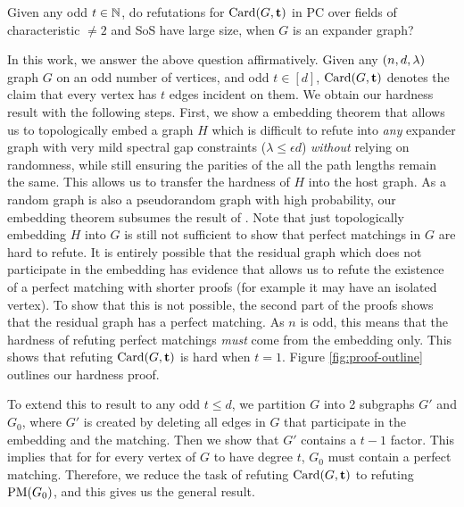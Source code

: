 \documentclass[11pt]{article}
\begin{document}
\begin{problem}
  
Given any odd $t \in \mathbb{N}$, do refutations for $\text{Card}(G, \mathbf{t})$ in
PC over fields of characteristic $\neq 2$ and SoS have large size, when $G$ is an expander graph? 
\end{problem}

In this work, we answer the above question affirmatively.
Given any $(n, d, \lambda)$ graph $G$ on an odd number of vertices, and odd $t\in [d]$, $\text{Card}(G, \mathbf{t})$ denotes the claim that every vertex has $t$ edges incident on them.
We obtain our hardness result with the following steps.
First, we show a embedding theorem that allows us to topologically embed a graph $H$ which is difficult to refute into \emph{any} expander graph with very mild spectral gap constraints ($\lambda \leq \epsilon d$) \emph{without} relying on randomness, while still ensuring the parities of the all the path lengths remain the same.
This allows us to transfer the hardness of $H$ into the host graph.
As a random graph is also a pseudorandom graph with high probability, our embedding theorem subsumes the result of \citet{Austrin_2022}.
Note that just topologically embedding $H$ into $G$ is still not sufficient to show that perfect matchings in $G$ are hard to refute.
It is entirely possible that the residual graph which does not participate in the  embedding has evidence that allows us to refute the existence of a perfect matching with shorter proofs (for example it may have an isolated vertex).
To show that this is not possible, the second part of the proofs shows  that the residual graph has a perfect matching.
As $n$ is odd, this means that the hardness of refuting perfect matchings \emph{must} come from the embedding only.
This shows that refuting $\text{Card}(G, \mathbf{t})$ is hard when $t=1$.
Figure \ref{fig:proof-outline} outlines our hardness proof.  \par
To extend this to result to any odd $t \leq d$, we partition $G$ into 2 subgraphs $G'$ and $G_0$, where $G'$ is created by deleting all edges in $G$ that participate in the embedding and the matching.
Then we show that $G'$ contains a $t-1$ factor.
This implies that for for every vertex of $G$ to have degree $t$, $G_0$ must contain a perfect matching.
Therefore, we reduce the task of refuting $\text{Card}(G,\mathbf{t})$ to refuting $\text{PM}(G_0)$, and this gives us the general result.
\end{document}
